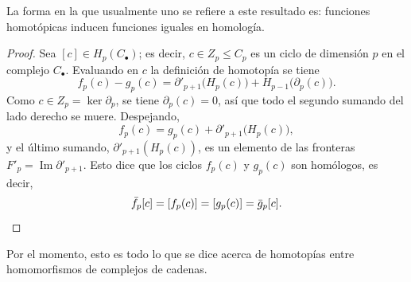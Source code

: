 \documentclass[11pt]{article}
\begin{document}
La forma en la que usualmente uno se refiere a este resultado es: \guillemotleft{}funciones homotópicas inducen funciones iguales en homología\guillemotright{}.

\begin{proof}
Sea $[c]\in H_p(C_\bullet)$; es decir, $c\in Z_p\le C_p$ es un ciclo de dimensión $p$ en el complejo $C_\bullet$. Evaluando en $c$ la definición de homotopía se tiene
\[
  f_p(c)-g_p(c)=\partial'_{p+1}\bigl(H_p(c)\bigr)+H_{p-1}\bigl(\partial_p(c)\bigr).
\]
Como $c\in Z_p=\ker\partial_p$, se tiene $\partial_p(c)=0$, así que todo el segundo sumando del lado derecho se muere. Despejando,
\[
  f_p(c)=g_p(c)+\partial'_{p+1}\bigl(H_p(c)\bigr),
\]
y el último sumando, $\partial'_{p+1}(H_p(c))$, es un elemento de las fronteras $F'_p=\operatorname{Im}\partial'_{p+1}$. Esto dice que los ciclos $f_p(c)$ y $g_p(c)$ son homólogos, es decir,
\[
  \bar f_p[c]=[f_p(c)]=[g_p(c)]=\bar g_p[c].\qedhere
\]
\end{proof}

Por el momento, esto es todo lo que se dice acerca de homotopías entre homomorfismos de complejos de cadenas.

\begin{erratas}
\end{erratas}
\end{document}
